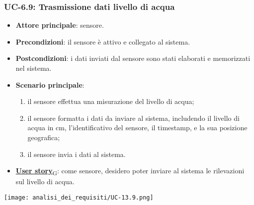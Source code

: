 \subsubsection{UC-6.9: Trasmissione dati livello di acqua}
\begin{itemize}
	\item \textbf{Attore principale}: sensore.
	\item \textbf{Precondizioni}: il sensore è attivo e collegato al sistema.
	\item \textbf{Postcondizioni}: i dati inviati dal sensore sono stati elaborati e memorizzati nel sistema.
	\item \textbf{Scenario principale}:
	      \begin{enumerate}
		      \item il sensore effettua una misurazione del livello di acqua;
		      \item il sensore formatta i dati da inviare al sistema, includendo il livello di acqua in cm, l'identificativo del sensore,
		            il timestamp, e la sua posizione geografica;
		      \item il sensore invia i dati al sistema.
	      \end{enumerate}
	\item \href{https://7last.github.io/docs/rtb/documentazione-interna/glossario\#user-story}{\textbf{User story}\textsubscript{G}}: come sensore, desidero poter inviare al sistema le rilevazioni sul livello di acqua.
\end{itemize}

\begin{center}
	\texttt{[image: analisi\_dei\_requisiti/UC-13.9.png]}
\end{center}

